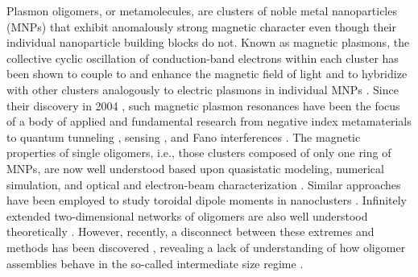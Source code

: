 \documentclass[journal=apchd5,manuscript=article]{achemso}
\begin{document}
Plasmon oligomers, or metamolecules, are clusters of noble metal nanoparticles (MNPs) that exhibit anomalously strong magnetic character even though their individual nanoparticle building blocks do not. Known as magnetic plasmons, the collective cyclic oscillation of conduction-band electrons within each cluster has been shown to couple to and enhance the magnetic field of light and to hybridize with other clusters analogously to electric plasmons in individual MNPs \cite{Zhang2006,Zhang2007,NordHal2011,NordHal2012,Cherqui2014,Cherqui2016,Engheta2017}. Since their discovery in 2004 \cite{Shalaev2004}, such magnetic plasmon resonances have been the focus of a body of applied and fundamental research from negative index metamaterials\cite{Alu2006,Alu2008} to quantum tunneling \cite{Dionne2016}, sensing \cite{Yang2013,Chen17}, and Fano interferences \cite{Dionne2011,Liu2011,Cherqui2016,Wang17}. The magnetic properties of single oligomers, i.e., those clusters composed of only one ring of MNPs, are now well understood based upon quasistatic modeling, numerical simulation, and optical and electron-beam characterization \cite{Nord2006,Dionne2011,Dionne2016,Capolino2017}. Similar approaches have been employed to study toroidal dipole moments in nanoclusters \cite{Ogut2012toroidal,Yang2013,Zheludev2016,Wang17}. Infinitely extended two-dimensional networks of oligomers are also well understood theoretically \cite{Schatz2003,Weick2013}. However, recently, a disconnect between these extremes and methods has been discovered \cite{Cherqui2014,Engheta2017}, revealing a lack of understanding of how oligomer assemblies behave in the so-called intermediate size regime \cite{NordHal2011,NordHal2012,Cherqui2014,Qian2015,Cherqui2016,Engheta2017,Fakhraai2018,Scherer2018}.
\end{document}
